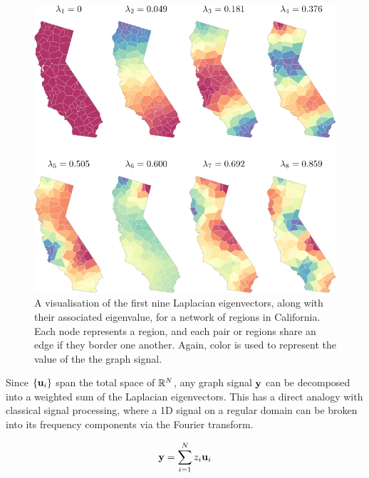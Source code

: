 \begin{figure}[t]
	\centering
		\includegraphics[width=0.85\linewidth]{Figures/cali_plot_eigs.pdf}
	\caption[A visualisation of the Laplacian eigenvectors for a network of regions in California]{A visualisation of the first nine Laplacian eigenvectors, along with their associated eigenvalue, for a network of regions in California. Each node represents a region, and each pair or regions share an edge if they border one another. Again, color is used to represent the value of the the graph signal. }
	\label{fig:cali_eigs}
\end{figure}


  
 

Since $\{\mathbf{u}_i\}$ span the total space of $\mathbb{R}^N$, any graph signal $\mathbf{y}$ can be decomposed into a weighted sum of the Laplacian eigenvectors. This has a direct analogy with classical signal processing, where a 1D signal on a regular domain can be broken into its frequency components via the Fourier transform. 

\begin{equation}
    \mathbf{y} = \sum_{i=1}^N z_i \mathbf{u}_i 
\end{equation}

